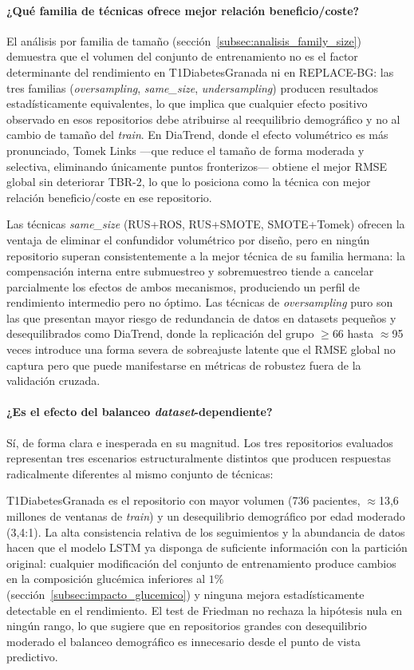 \paragraph{¿Qué familia de técnicas ofrece mejor relación beneficio/coste?}

El análisis por familia de tamaño
(sección~\ref{subsec:analisis_family_size}) demuestra que el volumen del
conjunto de entrenamiento no es el factor determinante del rendimiento
en T1DiabetesGranada ni en REPLACE-BG: las tres familias
(\textit{oversampling}, \textit{same\_size}, \textit{undersampling})
producen resultados estadísticamente equivalentes, lo que implica que
cualquier efecto positivo observado en esos repositorios debe atribuirse
al reequilibrio demográfico y no al cambio de tamaño del \textit{train}.
En DiaTrend, donde el efecto volumétrico es más pronunciado, Tomek Links
---que reduce el tamaño de forma moderada y selectiva, eliminando únicamente
puntos fronterizos--- obtiene el mejor RMSE global sin deteriorar TBR-2,
lo que lo posiciona como la técnica con mejor relación beneficio/coste
en ese repositorio.

Las técnicas \textit{same\_size} (RUS+ROS, RUS+SMOTE, SMOTE+Tomek)
ofrecen la ventaja de eliminar el confundidor volumétrico por diseño,
pero en ningún repositorio superan consistentemente a la mejor técnica
de su familia hermana: la compensación interna entre submuestreo y
sobremuestreo tiende a cancelar parcialmente los efectos de ambos
mecanismos, produciendo un perfil de rendimiento intermedio pero no
óptimo. Las técnicas de \textit{oversampling} puro son las que presentan
mayor riesgo de redundancia de datos en datasets pequeños y
desequilibrados como DiaTrend, donde la replicación del grupo $\geq$66
hasta $\approx$95 veces introduce una forma severa de sobreajuste latente
que el RMSE global no captura pero que puede manifestarse en métricas
de robustez fuera de la validación cruzada.

\paragraph{¿Es el efecto del balanceo \textit{dataset}-dependiente?}

Sí, de forma clara e inesperada en su magnitud. Los tres repositorios
evaluados representan tres escenarios estructuralmente distintos que
producen respuestas radicalmente diferentes al mismo conjunto de técnicas:

T1DiabetesGranada es el repositorio con mayor volumen (736 pacientes,
$\approx$13{,}6 millones de ventanas de \textit{train}) y un desequilibrio
demográfico por edad moderado (3{,}4:1). La alta consistencia relativa de
los seguimientos y la abundancia de datos hacen que el modelo LSTM ya
disponga de suficiente información con la partición original: cualquier
modificación del conjunto de entrenamiento produce cambios en la
composición glucémica inferiores al $1\%$ (sección~\ref{subsec:impacto_glucemico})
y ninguna mejora estadísticamente detectable en el rendimiento. El test
de Friedman no rechaza la hipótesis nula en ningún rango, lo que sugiere
que en repositorios grandes con desequilibrio moderado el balanceo
demográfico es innecesario desde el punto de vista predictivo.


